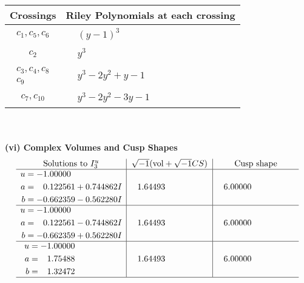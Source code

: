 \documentclass[1p]{elsarticle_modified}
\theoremstyle{definition}
\newcommand{\I}{\sqrt{-1}}
\begin{document}
\begin{tabular}{m{50pt}|m{274pt}}
Crossings & \hspace{64pt}Riley Polynomials at each crossing \\
\hline $$\begin{aligned}c_{1},c_{5},c_{6}\end{aligned}$$&$\begin{aligned}
&(y-1)^3
\end{aligned}$\\
\hline $$\begin{aligned}c_{2}\end{aligned}$$&$\begin{aligned}
&y^3
\end{aligned}$\\
\hline $$\begin{aligned}c_{3},c_{4},c_{8}\\c_{9}\end{aligned}$$&$\begin{aligned}
&y^3-2 y^2+y-1
\end{aligned}$\\
\hline $$\begin{aligned}c_{7},c_{10}\end{aligned}$$&$\begin{aligned}
&y^3-2 y^2-3 y-1
\end{aligned}$\\
\hline
\end{tabular}\\~\\
\newpage\flushleft \textbf{(vi) Complex Volumes and Cusp Shapes}
$$\begin{array}{c|c|c}  
\text{Solutions to }I^u_{3}& \I (\text{vol} + \sqrt{-1}CS) & \text{Cusp shape}\\
 \hline 
\begin{aligned}
u &= -1.00000\phantom{ +0.000000I} \\
a &= \phantom{-}0.122561 + 0.744862 I \\
b &= -0.662359 - 0.562280 I\end{aligned}
 & \phantom{-}1.64493\phantom{ +0.000000I} & \phantom{-}6.00000\phantom{ +0.000000I} \\ \hline\begin{aligned}
u &= -1.00000\phantom{ +0.000000I} \\
a &= \phantom{-}0.122561 - 0.744862 I \\
b &= -0.662359 + 0.562280 I\end{aligned}
 & \phantom{-}1.64493\phantom{ +0.000000I} & \phantom{-}6.00000\phantom{ +0.000000I} \\ \hline\begin{aligned}
u &= -1.00000\phantom{ +0.000000I} \\
a &= \phantom{-}1.75488\phantom{ +0.000000I} \\
b &= \phantom{-}1.32472\phantom{ +0.000000I}\end{aligned}
 & \phantom{-}1.64493\phantom{ +0.000000I} & \phantom{-}6.00000\phantom{ +0.000000I}\\
 \hline 
 \end{array}$$\newpage\newpage\renewcommand{\arraystretch}{1}
\end{document}
